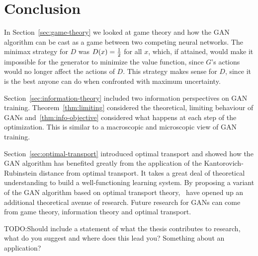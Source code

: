 \section{Conclusion}

In Section~\ref{sec:game-theory} we looked at game theory and how the GAN
algorithm can be cast as a game between two competing neural networks. The
minimax strategy for $D$ was $D(x) = {1 \over 2}$ for all $x$, which, if
attained, would make it impossible for the generator to minimize the value
function, since $G$'s actions would no longer affect the actions of $D$. This
strategy makes sense for $D$, since it is the best anyone can do when confronted
with maximum uncertainty.

Section~\ref{sec:information-theory} included two information perspectives on
GAN training. Theorem~\ref{thm:limiting} considered the theoretical, limiting
behaviour of GANs and~\ref{thm:info-objective} considered what happens at each
step of the optimization. This is similar to a macroscopic and microscopic view
of GAN training.

Section~\ref{sec:optimal-transport} introduced optimal transport and showed how
the GAN algorithm has benefited greatly from the application of the
Kantorovich-Rubinstein distance from optimal transport. It takes a great deal of
theoretical understanding to build a well-functioning learning system. By
proposing a variant of the GAN algorithm based on optimal transport
theory,~\cite{ref:arjovsky-2017} have opened up an additional theoretical avenue
of research. Future research for GANs can come from game theory, information
theory and optimal transport.

TODO:Should include a statement of what the thesis contributes to research, what
do you suggest and where does this lead you?  Something about an application?


